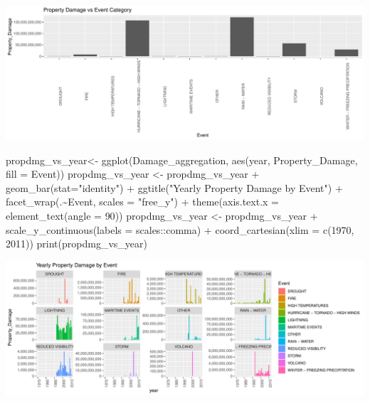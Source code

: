 \documentclass[
]{article}
\newenvironment{Shaded}{\begin{snugshade}}{\end{snugshade}}
\newcommand{\AttributeTok}[1]{\textcolor[rgb]{0.77,0.63,0.00}{#1}}
\newcommand{\DecValTok}[1]{\textcolor[rgb]{0.00,0.00,0.81}{#1}}
\newcommand{\FunctionTok}[1]{\textcolor[rgb]{0.00,0.00,0.00}{#1}}
\newcommand{\NormalTok}[1]{#1}
\newcommand{\OtherTok}[1]{\textcolor[rgb]{0.56,0.35,0.01}{#1}}
\newcommand{\SpecialCharTok}[1]{\textcolor[rgb]{0.00,0.00,0.00}{#1}}
\newcommand{\StringTok}[1]{\textcolor[rgb]{0.31,0.60,0.02}{#1}}
\begin{document}
\includegraphics{RepData_PeerAssessment2_files/figure-latex/Property Results-1.pdf}

\begin{Shaded}
\begin{Highlighting}[]
\NormalTok{propdmg\_vs\_year}\OtherTok{\textless{}{-}} \FunctionTok{ggplot}\NormalTok{(Damage\_aggregation, }\FunctionTok{aes}\NormalTok{(year, Property\_Damage, }\AttributeTok{fill =}\NormalTok{ Event))}
\NormalTok{propdmg\_vs\_year }\OtherTok{\textless{}{-}}\NormalTok{ propdmg\_vs\_year }\SpecialCharTok{+} \FunctionTok{geom\_bar}\NormalTok{(}\AttributeTok{stat=}\StringTok{"identity"}\NormalTok{) }\SpecialCharTok{+} \FunctionTok{ggtitle}\NormalTok{(}\StringTok{"Yearly Property Damage by Event"}\NormalTok{) }\SpecialCharTok{+} \FunctionTok{facet\_wrap}\NormalTok{(.}\SpecialCharTok{\textasciitilde{}}\NormalTok{Event, }\AttributeTok{scales =} \StringTok{"free\_y"}\NormalTok{) }\SpecialCharTok{+} \FunctionTok{theme}\NormalTok{(}\AttributeTok{axis.text.x =} \FunctionTok{element\_text}\NormalTok{(}\AttributeTok{angle =} \DecValTok{90}\NormalTok{))}
\NormalTok{propdmg\_vs\_year }\OtherTok{\textless{}{-}}\NormalTok{ propdmg\_vs\_year }\SpecialCharTok{+} \FunctionTok{scale\_y\_continuous}\NormalTok{(}\AttributeTok{labels =}\NormalTok{ scales}\SpecialCharTok{::}\NormalTok{comma) }\SpecialCharTok{+} \FunctionTok{coord\_cartesian}\NormalTok{(}\AttributeTok{xlim =} \FunctionTok{c}\NormalTok{(}\DecValTok{1970}\NormalTok{, }\DecValTok{2011}\NormalTok{))}
\FunctionTok{print}\NormalTok{(propdmg\_vs\_year)}
\end{Highlighting}
\end{Shaded}

\includegraphics{RepData_PeerAssessment2_files/figure-latex/Property Results-2.pdf}
\end{document}
